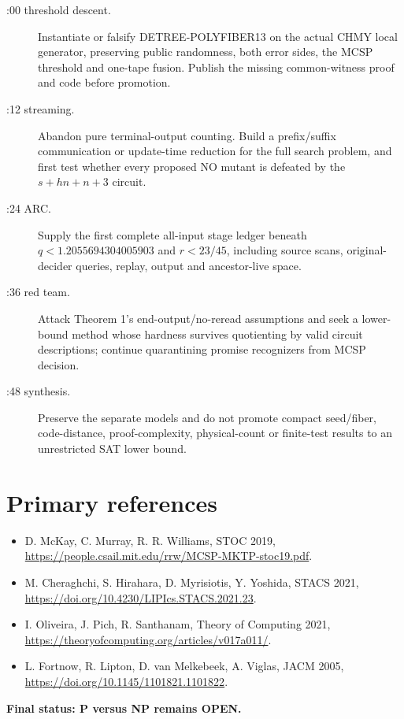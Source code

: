 \documentclass[11pt]{article}
\begin{document}
\begin{description}
\item[:00 threshold descent.] Instantiate or falsify DETREE-POLYFIBER13 on the
actual CHMY local generator, preserving public randomness, both error sides,
the MCSP threshold and one-tape fusion.  Publish the missing common-witness
proof and code before promotion.
\item[:12 streaming.] Abandon pure terminal-output counting.  Build a
prefix/suffix communication or update-time reduction for the full search
problem, and first test whether every proposed NO mutant is defeated by the
$s+hn+n+3$ circuit.
\item[:24 ARC.] Supply the first complete all-input stage ledger beneath
$q<1.2055694304005903$ and $r<23/45$, including source scans, original-decider
queries, replay, output and ancestor-live space.
\item[:36 red team.] Attack Theorem 1's end-output/no-reread assumptions and
seek a lower-bound method whose hardness survives quotienting by valid circuit
descriptions; continue quarantining promise recognizers from MCSP decision.
\item[:48 synthesis.] Preserve the separate models and do not promote compact
seed/fiber, code-distance, proof-complexity, physical-count or finite-test
results to an unrestricted SAT lower bound.
\end{description}

\section*{Primary references}
\begin{itemize}
\item D. McKay, C. Murray, R. R. Williams, STOC 2019,
\url{https://people.csail.mit.edu/rrw/MCSP-MKTP-stoc19.pdf}.
\item M. Cheraghchi, S. Hirahara, D. Myrisiotis, Y. Yoshida, STACS 2021,
\url{https://doi.org/10.4230/LIPIcs.STACS.2021.23}.
\item I. Oliveira, J. Pich, R. Santhanam, Theory of Computing 2021,
\url{https://theoryofcomputing.org/articles/v017a011/}.
\item L. Fortnow, R. Lipton, D. van Melkebeek, A. Viglas, JACM 2005,
\url{https://doi.org/10.1145/1101821.1101822}.
\end{itemize}

\noindent\textbf{Final status: P versus NP remains OPEN.}
\end{document}
